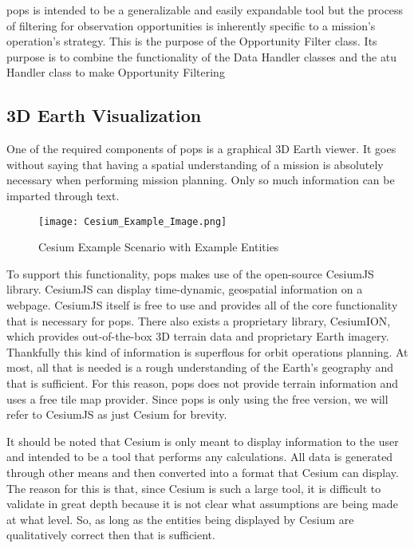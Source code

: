 \gls{pops} is intended to be a generalizable and easily expandable tool but the
process of filtering for observation opportunities is inherently specific to a
mission’s operation’s strategy. This is the purpose of the Opportunity Filter
class. Its purpose is to combine the functionality of the Data Handler classes
and the \gls{atu} Handler class  to make Opportunity Filtering


\subsection{3D Earth Visualization}

One of the required components of \gls{pops} is a graphical 3D Earth viewer.
It goes without saying that having a spatial understanding of a mission is
absolutely necessary when performing mission planning. Only so much information
can be imparted through text.

\begin{figure}[h]
    \centering
    \texttt{[image: Cesium\_Example\_Image.png]} 
    \caption{Cesium Example Scenario with Example Entities}
    \label{fig:example_cesium}
\end{figure}

To support this functionality, \gls{pops} makes use of the open-source CesiumJS
library. CesiumJS can display time-dynamic, geospatial information on a
webpage. CesiumJS itself is free to use and provides all of the core
functionality that is necessary for \gls{pops}. There also exists a proprietary
library, CesiumION, which provides out-of-the-box 3D terrain data and
proprietary Earth imagery. Thankfully this kind of information is superflous
for orbit operations planning. At most, all that is needed is a rough
understanding of the Earth's geography and that is sufficient. For this reason,
\gls{pops} does not provide terrain information and uses a free tile map
provider. Since \gls{pops} is only using the free version, we will refer to
CesiumJS as just Cesium for brevity. 

It should be noted that Cesium is only meant to display information to the user
and intended to be a tool that performs any calculations. All data is generated
through other means and then converted into a format that Cesium can display.
The reason for this is that, since Cesium is such a large tool, it is difficult
to validate in great depth because it is not clear what assumptions are being
made at what level. So, as long as the entities being displayed by Cesium are
qualitatively correct then that is sufficient.


